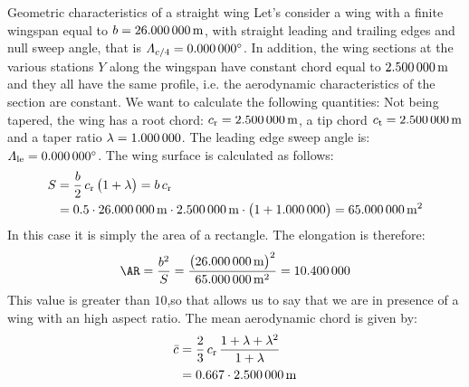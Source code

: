 \documentclass[[12pt,twoside]{book}
\begin{document}
\begin{myExampleX}{Geometric characteristics of a straight wing}{}%
\label{example:Geometric:Characteristics:Of:A:Straight:Wing}
%
\noindent
Let's consider a wing with a finite wingspan equal to $b=\SI[round-precision=1]{\mySpanWingMT}{\metre}$, with straight leading and trailing edges and null sweep angle, that is $\Lambda_{c/4}=\SI[round-precision=0]{\myLambdaCQuarter}{\degree}$.
In addition, the wing sections at the various stations $Y$ along the wingspan have constant chord equal to $\SI[round-precision=2]{\myChordRootWingMT}{\metre}$
and they all have the same profile, i.e. the aerodynamic characteristics of the section are constant. We want to calculate the following quantities:
\noindent
{}%
\medskip
\noindent
Not being tapered, the wing has a root chord:
$c_\mathrm{r}=\SI[round-precision=2]{\myChordRootWingMT}{\metre}$,
a tip chord $c_\mathrm{t}=\SI[round-precision=2]{\myChordTipWingMT}{\metre}$
and a taper ratio $\lambda=\SI[round-precision=0]{\myTaperRatioWing}{}$.
The leading edge sweep angle is:
 $\Lambda_\mathrm{le}=\SI[round-precision=0]{\myLambdaCQuarter}{\degree}$.
\noindent
The wing surface is calculated as follows:
\[
\begin{split}
S & {}= \frac{b}{2} \, c_\mathrm{r} \, \big( 1 + \lambda \big) = b\,c_\mathrm{r}\\
  & {}=
    \num{0.5} \cdot \SI[round-precision=1]{\mySpanWingMT}{\metre}
      \cdot \SI[round-precision=2]{\myChordRootWingMT}{\metre}
      \cdot \big( 1 + \SI[round-precision=0]{\myTaperRatioWing}{} \big) 
    = { \SI[round-precision=1]{\myAreaWingMTsquared}{\metre^2} }
\end{split}
\]
In this case it is simply the area of a rectangle.
\noindent
The elongation is therefore:
\[
\AR 
  = \frac{b^2}{S}
  = \frac{\big(\SI[round-precision=1]{\mySpanWingMT}{\metre}\big)^2}{\SI[round-precision=1]{\myAreaWingMTsquared}{\metre^2}}
  ={ \num[round-precision=2]{\myAspectRatioWing} }
\]
This value is greater than $\num[round-precision=0]{10}$,so that allows us to say that we are in presence of a wing with an high aspect ratio.
\noindent
The mean aerodynamic chord is given by:
\[
\begin{split}
\bar{c} & {}= \frac{2}{3} \, c_\mathrm{r} \, \frac{1+\lambda + \lambda^2}{1+\lambda} \\
  & {}=
    \num{0.667} \cdot \SI[round-precision=2]{\myChordRootWingMT}{\metre}

\end{split}\]
\end{myExampleX}
\end{document}
